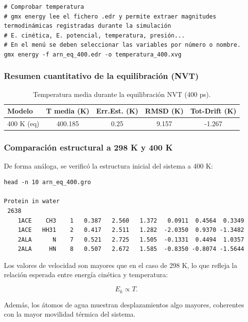\documentclass[12pt,a4paper]{article}
\begin{document}
\begin{lstlisting}[style=bashstyle]
# Comprobar temperatura
# gmx energy lee el fichero .edr y permite extraer magnitudes termodinámicas registradas durante la simulación
# E. cinética, E. potencial, temperatura, presión...
# En el menú se deben seleccionar las variables por número o nombre.
gmx energy -f arn_eq_400.edr -o temperatura_400.xvg
\end{lstlisting}

\subsubsection*{Resumen cuantitativo de la equilibración (NVT)}

\begin{table}[H]
\centering
\begin{tabular}{lcccc}
\toprule
\textbf{Modelo} & \textbf{T media (K)} & \textbf{Err.Est. (K)} & \textbf{RMSD (K)} & \textbf{Tot-Drift (K)} \\
\midrule
400 K (eq) & 400.185 & 0.25 & 9.157 & -1.267 \\
\bottomrule
\end{tabular}
\caption{Temperatura media durante la equilibración NVT (400 ps).}
\end{table}

\subsubsection*{Comparación estructural a 298 K y 400 K}

De forma análoga, se verificó la estructura inicial del sistema a 400 K:

\begin{verbatim}
head -n 10 arn_eq_400.gro

Protein in water
 2638
    1ACE    CH3    1   0.387   2.560   1.372   0.0911  0.4564  0.3349
    1ACE   HH31    2   0.417   2.511   1.282  -2.0350  0.9370 -1.3482
    2ALA      N    7   0.521   2.725   1.505  -0.1331  0.4494  1.0357
    2ALA     HN    8   0.507   2.672   1.585  -0.8350 -0.8074 -1.5644
\end{verbatim}

Los valores de velocidad son mayores que en el caso de 298 K, lo que refleja
la relación esperada entre energía cinética y temperatura:

\[
E_k \propto T.
\]

Además, los átomos de agua muestran desplazamientos algo mayores, coherentes con
la mayor movilidad térmica del sistema.
\end{document}
